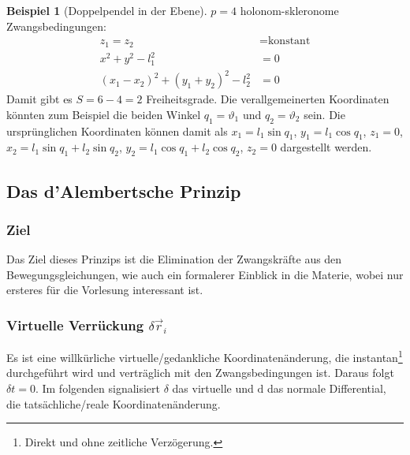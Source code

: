 \documentclass[oneside]{book}
\theoremstyle{definition}
\newtheorem*{beispiel*}{Beispiel}
\newcommand{\conseq}{$\rightarrow$~}
\renewcommand{\d}{\mathrm d}
\begin{document}
\begin{beispiel*}[Doppelpendel in der Ebene] $p = 4$ holonom-skleronome Zwangsbedingungen:
\begin{align*}
	z_1 = z_2 &= \text{konstant}\\
	x^2 + y^2 - l^2_1 &= 0\\
	(x_1 - x_2)^2 + (y_1 + y_2)^2 - l_2^2 &= 0 
\end{align*}
Damit gibt es $S = 6 - 4= 2$ Freiheitsgrade. Die verallgemeinerten Koordinaten könnten zum Beispiel die beiden Winkel $q_1 = \vartheta_1$ und $q_2 = \vartheta_2$ sein. Die ursprünglichen Koordinaten können damit als $x_1 = l_1 \sin q_1$, $y_1 = l_1 \cos q_1$, $z_1 = 0$, $x_2 = l_1 \sin q_1 + l_2 \sin q_2$, $y_2 = l_1 \cos q_1 + l_2 \cos q_2$, $z_2 = 0$  dargestellt werden.
\end{beispiel*}


\subsection{Das d'Alembertsche Prinzip}

\subsubsection{Ziel} Das Ziel dieses Prinzips ist die Elimination der Zwangskräfte aus den Bewegungsgleichungen, wie auch ein formalerer Einblick in die Materie, wobei nur ersteres für die Vorlesung interessant ist.


\subsubsection{Virtuelle Verrückung $\delta \vec{r}_i$} Es ist eine willkürliche virtuelle/gedankliche Koordinatenänderung, die instantan\footnote{Direkt und ohne zeitliche Verzögerung.} durchgeführt wird und verträglich mit den Zwangsbedingungen ist. Daraus folgt $\delta t = 0$. Im folgenden signalisiert $\delta$ das virtuelle und $\d$ das normale Differential, die tatsächliche/reale Koordinatenänderung.
\end{document}
